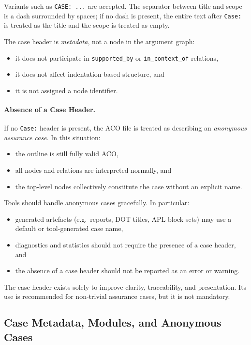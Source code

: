 \documentclass[11pt,twoside,a4paper]{article}
\begin{document}
Variants such as \texttt{CASE: ...} are accepted. The separator between title and scope
is a dash surrounded by spaces; if no dash is present, the entire text after
\texttt{Case:} is treated as the title and the scope is treated as empty.

The case header is \emph{metadata}, not a node in the argument graph:
\begin{itemize}[leftmargin=2em]
  \item it does not participate in \texttt{supported\_by} or \texttt{in\_context\_of} relations,
  \item it does not affect indentation-based structure, and
  \item it is not assigned a node identifier.
\end{itemize}

\paragraph{Absence of a Case Header.}
If no \texttt{Case:} header is present, the ACO file is treated as describing an
\emph{anonymous assurance case}. In this situation:
\begin{itemize}[leftmargin=2em]
  \item the outline is still fully valid ACO,
  \item all nodes and relations are interpreted normally, and
  \item the top-level nodes collectively constitute the case without an explicit name.
\end{itemize}

Tools should handle anonymous cases gracefully. In particular:
\begin{itemize}[leftmargin=2em]
  \item generated artefacts (e.g.\ reports, DOT titles, APL block sets) may use
        a default or tool-generated case name,
  \item diagnostics and statistics should not require the presence of a case header, and
  \item the absence of a case header should not be reported as an error or warning.
\end{itemize}

The case header exists solely to improve clarity, traceability, and presentation.
Its use is recommended for non-trivial assurance cases, but it is not mandatory.

\subsection{Case Metadata, Modules, and Anonymous Cases}
\end{document}
